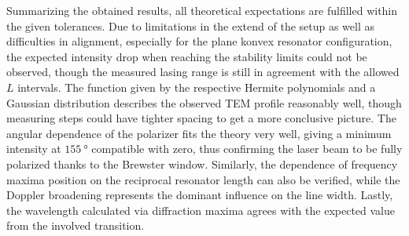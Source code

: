 Summarizing the obtained results, all theoretical expectations are fulfilled within the given tolerances. Due to limitations in the extend
of the setup as well as difficulties in alignment, especially for the plane konvex resonator configuration, the expected intensity drop when
reaching the stability limits could not be observed, though the measured lasing range is still in agreement with the allowed $L$ intervals.
The function given by the respective Hermite polynomials and a Gaussian distribution describes the observed TEM profile reasonably well,
though measuring steps could have tighter spacing to get a more conclusive picture. The angular dependence of the polarizer fits the theory
very well, giving a minimum intensity at $\qty{155}{\degree}$ compatible with zero, thus confirming the laser beam to be fully polarized thanks
to the Brewster window. Similarly, the dependence of frequency maxima position on the reciprocal resonator length can also be verified, while
the Doppler broadening represents the dominant influence on the line width. Lastly, the wavelength calculated via diffraction maxima agrees
with the expected value from the involved transition.
